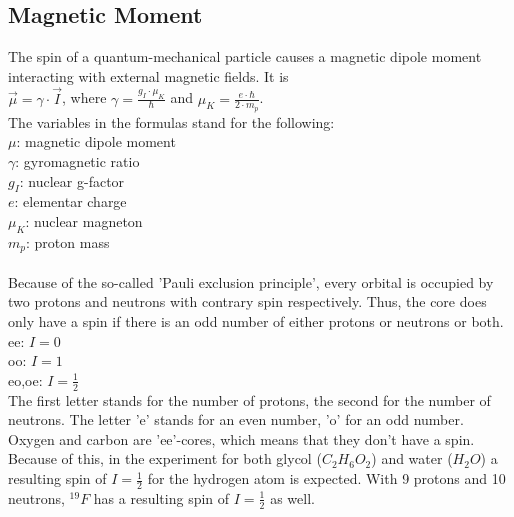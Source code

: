 \subsection{Magnetic Moment}
The spin of a quantum-mechanical particle causes a magnetic dipole moment interacting with external magnetic fields. It is\\
$\vec{\mu}=\gamma\cdot\vec{I}$, where $\gamma=\frac{g_{I}\cdot\mu_{K}}{\hbar}$ and $\mu_{K}=\frac{e\cdot\hbar}{2\cdot m_{p}}$.\\
The variables in the formulas stand for the following:\\
$\mu$: magnetic dipole moment\\
$\gamma$: gyromagnetic ratio\\
$g_{I}$: nuclear g-factor\\
$e$: elementar charge\\
$\mu_{K}$: nuclear magneton\\
$m_{p}$: proton mass\\
~\\
Because of the so-called 'Pauli exclusion principle', every orbital is occupied by two protons and neutrons with contrary spin respectively. Thus, the core does only have a spin if there is an odd number of either protons or neutrons or both.\\
ee: $I=0$\\
oo: $I=1$\\
eo,oe: $I=\frac{1}{2}$\\
The first letter stands for the number of protons, the second for the number of neutrons. The letter 'e' stands for an even number, 'o' for an odd number.\\
Oxygen and carbon are 'ee'-cores, which means that they don't have a spin. Because of this, in the experiment for both glycol ($C_{2}H_{6}O_{2}$) and water ($H_{2}O$) a resulting spin of $I=\frac{1}{2}$ for the hydrogen atom is expected. With 9 protons and 10 neutrons, $^{19}F$ has a resulting spin of $I=\frac{1}{2}$ as well.\\
